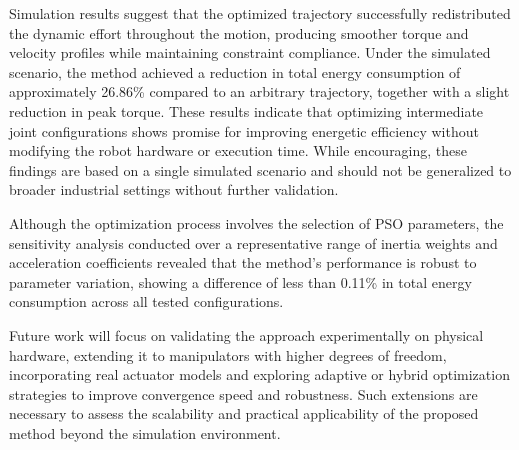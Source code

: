 \documentclass[runningheads]{llncs}
\begin{document}
Simulation results suggest that the optimized trajectory successfully redistributed the dynamic effort throughout the motion, producing smoother torque and velocity profiles 
while maintaining constraint compliance. Under the simulated scenario, the method achieved a reduction in total energy consumption of approximately 26.86\% compared to an arbitrary trajectory, together with a slight reduction in peak torque. These results indicate that optimizing intermediate joint configurations shows promise for improving energetic efficiency without modifying the robot hardware or execution time. While encouraging, these findings are based on a single simulated scenario and should not be generalized to broader industrial settings without further validation.

Although the optimization process involves the selection of PSO parameters, the sensitivity analysis conducted over a representative range of inertia weights and acceleration coefficients revealed that the method's performance is robust to parameter variation, showing a difference of less than 0.11\% in total energy consumption across all tested configurations.

Future work will focus on validating the approach experimentally on physical hardware, extending it to manipulators with higher degrees of freedom, incorporating real actuator models and exploring adaptive or hybrid optimization strategies to improve convergence speed and robustness. Such extensions are necessary to assess the scalability and practical applicability of the proposed method beyond the simulation environment.
 
\end{document}
